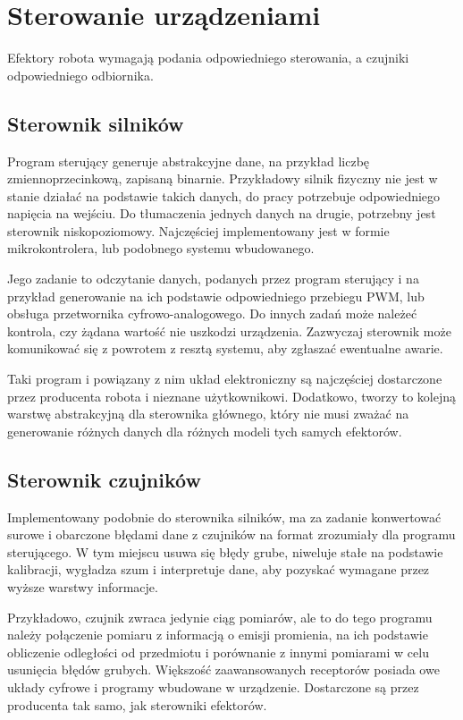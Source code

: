 \section{Sterowanie urządzeniami}
	Efektory robota wymagają podania odpowiedniego sterowania, a czujniki odpowiedniego odbiornika.
	\subsection{Sterownik silników}
		Program sterujący generuje abstrakcyjne dane, na przykład liczbę zmiennoprzecinkową, zapisaną binarnie.
		Przykładowy silnik fizyczny nie jest w stanie działać na podstawie takich danych, do pracy potrzebuje odpowiedniego napięcia na wejściu.
		Do tłumaczenia jednych danych na drugie, potrzebny jest sterownik niskopoziomowy.
		Najczęściej implementowany jest w formie mikrokontrolera, lub podobnego systemu wbudowanego.

		Jego zadanie to odczytanie danych, podanych przez program sterujący i na przykład generowanie na ich podstawie odpowiedniego przebiegu PWM, lub obsługa przetwornika cyfrowo-analogowego.
		Do innych zadań może należeć kontrola, czy żądana wartość nie uszkodzi urządzenia.
		Zazwyczaj sterownik może komunikować się z powrotem z resztą systemu, aby zgłaszać ewentualne awarie.

		Taki program i powiązany z nim układ elektroniczny są najczęściej dostarczone przez producenta robota i nieznane użytkownikowi.
		Dodatkowo, tworzy to kolejną warstwę abstrakcyjną dla sterownika głównego, który nie musi zważać na generowanie różnych danych dla różnych modeli tych samych efektorów.
		
	\subsection{Sterownik czujników}
		Implementowany podobnie do sterownika silników, ma za zadanie konwertować surowe i obarczone błędami dane z czujników na format zrozumiały dla programu sterującego.
		W tym miejscu usuwa się błędy grube, niweluje stałe na podstawie kalibracji, wygładza szum i interpretuje dane, aby pozyskać wymagane przez wyższe warstwy informacje.

		Przykładowo, czujnik zwraca jedynie ciąg pomiarów, ale to do tego programu należy połączenie pomiaru z informacją o emisji promienia, na ich podstawie obliczenie odległości od przedmiotu i porównanie z innymi pomiarami w celu usunięcia błędów grubych.
		Większość zaawansowanych receptorów posiada owe układy cyfrowe i programy wbudowane w urządzenie.
		Dostarczone są przez producenta tak samo, jak sterowniki efektorów.
		
